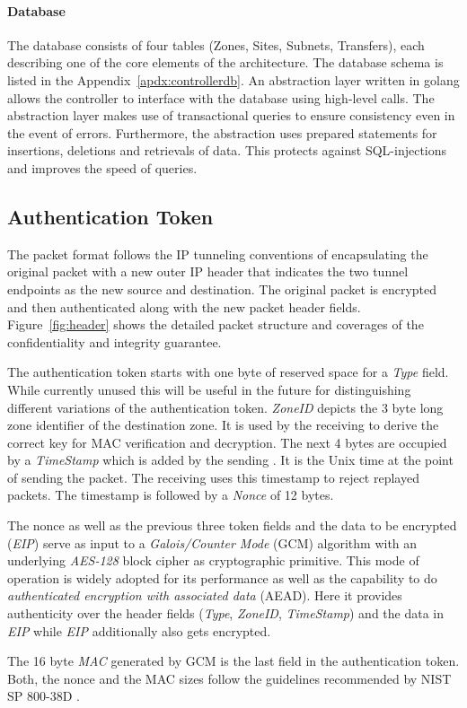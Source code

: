 \paragraph{Database}
The database consists of four tables (Zones, Sites, Subnets, Transfers), each describing one of 
the core elements of the architecture.
The database schema is listed in the Appendix~\ref{apdx:controllerdb}. An abstraction layer 
written in golang allows the controller to interface with the database using high-level calls. 
The abstraction layer makes use of transactional queries to ensure consistency even in the event 
of errors. Furthermore, the abstraction uses prepared statements for insertions, deletions and 
retrievals of data. This protects against SQL-injections and improves the speed of queries. 


\subsection{Authentication Token}
\label{ssec:token}

The \name packet format follows the IP tunneling conventions of encapsulating the original 
packet with a new outer IP header that indicates the two tunnel endpoints as the new source 
and destination. The original packet is encrypted and then authenticated along with the new
packet header fields. Figure~\ref{fig:header} shows the detailed packet structure and coverages 
of the confidentiality and integrity guarantee. 

The authentication token starts with one byte of reserved space for a \textit{Type} field. While 
currently unused this will be useful in the future for distinguishing different variations of 
the authentication token. \textit{ZoneID} depicts the 3 byte long zone identifier of the 
destination zone. It is used by the receiving \tp to derive the correct key for MAC verification 
and decryption. The next 4 bytes are occupied by a \textit{TimeStamp} which is added by the 
sending \tp. It is the Unix time at the point of sending the packet. The receiving \tp uses this 
timestamp to reject replayed packets. The timestamp is followed by a \textit{Nonce} of 12 bytes.

The nonce as well as the previous three token fields and the data to be encrypted (\textit{EIP}) 
serve as input to a \textit{Galois/Counter Mode} (GCM) algorithm with an underlying 
\textit{AES-128} block cipher as cryptographic primitive. This mode of operation is widely 
adopted for its performance as well as the capability to do \textit{authenticated encryption 
with associated data} (AEAD). Here it provides authenticity over the header fields 
(\textit{Type}, \textit{ZoneID}, \textit{TimeStamp}) and the data in \textit{EIP} while 
\textit{EIP} additionally also gets encrypted.

The 16 byte \textit{MAC} generated by GCM is the last field in the authentication token. Both, 
the nonce and the MAC sizes follow the guidelines recommended by NIST SP 800-38D \cite{nistgcm}.

